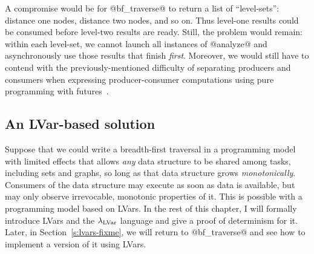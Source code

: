 A compromise would be for @bf_traverse@ to return a list of
``level-sets'': distance one nodes, distance two nodes, and so on.
Thus level-one results could be consumed before level-two results are
ready.  Still, the problem would remain: within each level-set, we
cannot launch all instances of @analyze@ and asynchronously use those
results that finish \emph{first}.  Moreover, we would still have to
contend with the previously-mentioned difficulty of separating
producers and consumers when expressing producer-consumer computations
using pure programming with futures~\cite{monad-par}.

\subsection{An LVar-based solution}

Suppose that we could write a breadth-first traversal in a programming
model with limited effects that allows \emph{any} data structure to be
shared among tasks, including sets and graphs, so long as that data
structure grows \emph{monotonically}.  Consumers of the data structure
may execute as soon as data is available, but may only observe
irrevocable, monotonic properties of it. This is possible with a
programming model based on LVars.  In the rest of this chapter, I will
formally introduce LVars and the $\lambda_{\textrm{LVar}}$ language and give a
proof of determinism for it.  Later, in Section~\ref{s:lvars-fixme},
we will return to @bf_traverse@ and see how to implement a version of
it using LVars. 
